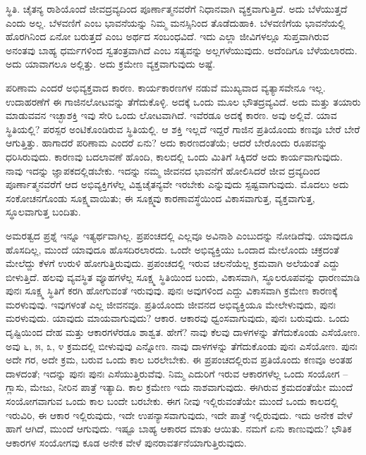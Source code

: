 ಸ್ಥಿತಿ. ಚೈತನ್ಯ ರಾಶಿಯೊಂದೆ ಜೀವದ್ರವ್ಯದಿಂದ ಪೂರ್ಣಾತ್ಮನವರೆಗೆ ನಿಧಾನವಾಗಿ ವ್ಯಕ್ತವಾಗುತ್ತಿದೆ. ಅದು ಬೆಳೆಯುತ್ತದೆ ಎಂದು ಅಲ್ಲ. ಬೆಳವಣಿಗೆ ಎಂಬ ಭಾವನೆಯನ್ನು ನಿಮ್ಮ ಮನಸ್ಸಿನಿಂದ ತೊಡೆದುಹಾಕಿ. ಬೆಳವಣಿಗೆಯ ಭಾವನೆಯಲ್ಲಿ ಹೊರಗಿನಿಂದ ಏನೋ ಬರುತ್ತದೆ ಎಂಬ ಅರ್ಥದ ಸಂಬಂಧವಿದೆ. ಇದು ಎಲ್ಲಾ ಜೀವಿಗಳಲ್ಲೂ ಸುಪ್ತವಾಗಿರುವ ಅನಂತವು ಬಾಹ್ಯ ಧರ್ಮಗಳಿಂದ ಸ್ವತಂತ್ರವಾಗಿದೆ ಎಂಬ ಸತ್ಯವನ್ನು ಅಲ್ಲಗಳೆಯುವುದು. ಅದೆಂದಿಗೂ ಬೆಳೆಯಲಾರದು. ಅದು ಯಾವಾಗಲೂ ಅಲ್ಲಿತ್ತು. ಅದು ಕ್ರಮೇಣ ವ್ಯಕ್ತವಾಗುವುದು ಅಷ್ಟೆ.

\vskip 0.2cm

ಪರಿಣಾಮ ಎಂದರೆ ಅಭಿವ್ಯಕ್ತವಾದ ಕಾರಣ. ಕಾರ್ಯಕಾರಣಗಳ ನಡುವೆ ಮುಖ್ಯವಾದ ವ್ಯತ್ಯಾಸವೇನೂ ಇಲ್ಲ. ಉದಾಹರಣೆಗೆ ಈ ಗಾಜಿನಲೋಟವನ್ನು ತೆಗೆದುಕೊಳ್ಳಿ. ಅದಕ್ಕೆ ಒಂದು ಮೂಲ ಭೌತದ್ರವ್ಯವಿದೆ. ಅದು ಮತ್ತು ತಯಾರು ಮಾಡುವವನ ಇಚ್ಛಾಶಕ್ತಿ ಇವು ಸೇರಿ ಒಂದು ಲೋಟವಾಗಿದೆ. ಇವೆರಡೂ ಅದಕ್ಕೆ ಕಾರಣ. ಅವು ಅಲ್ಲಿವೆ. ಯಾವ ಸ್ಥಿತಿಯಲ್ಲಿ? ಪರಸ್ಪರ ಅಂಟಿಕೊಂಡಿರುವ ಸ್ಥಿತಿಯಲ್ಲಿ. ಆ ಶಕ್ತಿ ಇಲ್ಲದೆ ಇದ್ದರೆ ಗಾಜಿನ ಪ್ರತಿಯೊಂದು ಕಣವೂ ಬೇರೆ ಬೇರೆ ಆಗುತ್ತಿತ್ತು. ಹಾಗಾದರೆ ಪರಿಣಾಮ ಎಂದರೆ ಏನು? ಅದು ಕಾರಣದಂತೆಯೆ; ಆದರೆ ಬೇರೊಂದು ರೂಪವನ್ನು ಧರಿಸಿರುವುದು. ಕಾರಣವು ಬದಲಾವಣೆ ಹೊಂದಿ, ಕಾಲದಲ್ಲಿ ಒಂದು ಮಿತಿಗೆ ಸಿಕ್ಕಿದರೆ ಅದು ಕಾರ್ಯವಾಗುವುದು. ನಾವು ಇದನ್ನು ಜ್ಞಾಪಕದಲ್ಲಿಡಬೇಕು. ಇದನ್ನು ನಮ್ಮ ಜೀವನದ ಭಾವನೆಗೆ ಹೋಲಿಸಿದರೆ ಜೀವ ದ್ರವ್ಯದಿಂದ ಪೂರ್ಣಾತ್ಮನವರೆಗೆ ಆದ ಅಭಿವ್ಯಕ್ತಿಗಳೆಲ್ಲ ವಿಶ್ವಚೈತನ್ಯವೇ ಇರಬೇಕು ಎನ್ನುವುದು ಸ್ಪಷ್ಟವಾಗುವುದು. ಮೊದಲು ಅದು ಸಂಕೋಚನಗೊಂಡು ಸೂಕ್ಷ್ಮವಾಯಿತು; ಈ ಸೂಕ್ಷ್ಮವು ಕಾರಣಾವಸ್ಥೆಯಿಂದ ವಿಕಾಸವಾಗುತ್ತ, ವ್ಯಕ್ತವಾಗುತ್ತ, ಸ್ಥೂಲವಾಗುತ್ತ ಬಂದಿತು.

\vskip 0.2cm

ಅಮರತ್ವದ ಪ್ರಶ್ನೆ ಇನ್ನೂ ಇತ್ಯರ್ಥವಾಗಿಲ್ಲ. ಪ್ರಪಂಚದಲ್ಲಿ ಎಲ್ಲವೂ ಅವಿನಾಶಿ ಎಂಬುದನ್ನು ನೋಡಿದೆವು. ಯಾವುದೂ ಹೊಸದಿಲ್ಲ, ಮುಂದೆ ಯಾವುದೂ ಹೊಸದಿರಲಾರದು. ಒಂದೇ ಅಭಿವ್ಯಕ್ತಿಯು ಒಂದಾದ ಮೇಲೊಂದು ಚಕ್ರದಂತೆ ಮೇಲೆದ್ದು ಕೆಳಗೆ ಉರುಳಿ ಹೋಗುತ್ತಿರುವುದು. ಪ್ರಪಂಚದಲ್ಲಿ ಇರುವ ಚಲನೆಯೆಲ್ಲ ಕ್ರಮವಾಗಿ ಅಲೆಯಂತೆ ಎದ್ದು ಬೀಳುತ್ತಿದೆ. ಹಲವು ವ್ಯವಸ್ಥಿತ ವ್ಯೂಹಗಳೆಲ್ಲ ಸೂಕ್ಷ್ಮ ಸ್ಥಿತಿಯಿಂದ ಬಂದು, ವಿಕಾಸವಾಗಿ, ಸ್ಥೂಲರೂಪವನ್ನು ಧಾರಣಮಾಡಿ ಪುನಃ ಸೂಕ್ಷ್ಮ ಸ್ಥಿತಿಗೆ ಕರಗಿ ಹೋಗುವಂತೆ ಇರುವುವು. ಪುನಃ ಅವುಗಳಿಂದ ಎದ್ದು ವಿಕಾಸವಾಗಿ ಕ್ರಮೇಣ ಕಾರಣಕ್ಕೆ ಮರಳುವುವು. ಇವುಗಳಂತೆ ಎಲ್ಲ ಜೀವನವೂ. ಪ್ರತಿಯೊಂದು ಜೀವನದ ಅಭಿವ್ಯಕ್ತಿಯೂ ಮೇಲೇಳುವುದು, ಪುನಃ ಮರಳುವುದು. ಯಾವುದು ಮಾಯವಾಗುವುದು? ಆಕಾರ. ಆಕಾರವು ಧ್ವಂಸವಾಗುವುದು, ಪುನಃ ಬರುವುದು. ಒಂದು ದೃಷ್ಟಿಯಿಂದ ದೇಹ ಮತ್ತು ಆಕಾರಗಳೆರಡೂ ಶಾಶ್ವತ. ಹೇಗೆ? ನಾವು ಕೆಲವು ದಾಳಗಳನ್ನು ತೆಗೆದುಕೊಂಡು ಎಸೆಯೋಣ. ಅವು ೬, ೫, ೩, ೪ ಕ್ರಮದಲ್ಲಿ ಬೀಳುವುವು ಎನ್ನೋಣ. ನಾವು ದಾಳಗಳನ್ನು ತೆಗೆದುಕೊಂಡು ಪುನಃ ಎಸೆಯೋಣ. ಪುನಃ ಅದೇ ಗರ, ಅದೇ ಕ್ರಮ, ಬರುವ ಒಂದು ಕಾಲ ಬರಲೇಬೇಕು. ಈ ಪ್ರಪಂಚದಲ್ಲಿರುವ ಪ್ರತಿಯೊಂದು ಕಣವೂ ಅಂತಹ ದಾಳದಂತೆ; ಇದನ್ನು ಪುನಃ ಪುನಃ ಎಸೆಯುತ್ತಿರುವೆವು. ನಿಮ್ಮ ಎದುರಿಗೆ ಇರುವ ಆಕಾರಗಳೆಲ್ಲ ಒಂದು ಸಂಯೋಗ – ಗ್ಲಾಸು, ಮೇಜು, ನೀರಿನ ಪಾತ್ರೆ ಇತ್ಯಾದಿ. ಕಾಲ ಕ್ರಮೇಣ ಇದು ನಾಶವಾಗುವುದು. ಈಗಿರುವ ಕ್ರಮದಂತೆಯೇ ಮುಂದೆ ಸಂಯೋಗವಾಗುವ ಒಂದು ಕಾಲ ಬಂದೇ ಬರಬೇಕು. ಈಗ ನೀವು ಇಲ್ಲಿರುವಂತೆಯೇ ಮುಂದೆ ಒಂದು ಕಾಲದಲ್ಲಿ ಇರುವಿರಿ, ಈ ಆಕಾರ ಇಲ್ಲಿರುವುದು, ಇದೇ ಉಪನ್ಯಾಸವಾಗುವುದು, ಇದೇ ಪಾತ್ರೆ ಇಲ್ಲಿರುವುದು. ಇದು ಅನೇಕ ವೇಳೆ ಹಾಗೆ ಆಗಿದೆ, ಮುಂದೆ ಆಗುವುದು. ಇಷ್ಟೂ ಬಾಹ್ಯ ಆಕಾರದ ಮಾತು ಆಯಿತು. ನಮಗೆ ಏನು ಕಾಣುವುದು? ಭೌತಿಕ ಆಕಾರಗಳ ಸಂಯೋಗವು ಕೂಡ ಅನೇಕ ವೇಳೆ ಪುನರಾವರ್ತನೆಯಾಗುತ್ತಿರುವುದು.

